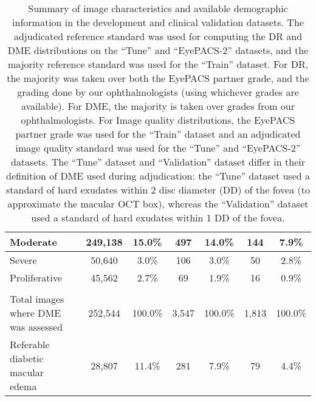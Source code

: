 \documentclass{llncs}
\begin{document}
\begin{table}[h!]
\begin{tabular}{|l|c|c|c|c|c|c|}
    Moderate & 249,138 & 15.0\% & 497 & 14.0\% & 144 & 7.9\% \\ \hline
    Severe & 50,640 & 3.0\% & 106 & 3.0\% & 50 & 2.8\% \\ \hline
    Proliferative & 45,562 & 2.7\% & 69 & 1.9\% & 16 & 0.9\% \\ \hline
    \multicolumn{7}{|c|}{} \\ \hline
    \makecell[l]{Total images where DME \\ was assessed} & 252,544 & 100.0\% & 3,547 & 100.0\% & 1,813 & 100.0\% \\ \hline
    \makecell[l]{Referable diabetic macular \\ edema} & 28,807 & 11.4\% & 281 & 7.9\% & 79 & 4.4\% \\ \hline
  \end{tabular}
  \vspace{4mm}
  \caption{
    Summary of image characteristics and available demographic information in the development and clinical validation datasets. The adjudicated reference standard was used for computing the DR and DME distributions on the ``Tune'' and ``EyePACS-2'' datasets, and the majority reference standard was used for the ``Train'' dataset. For DR, the majority was taken over both the EyePACS partner grade, and the grading done by our ophthalmologists (using whichever grades are available). For DME, the majority is taken over grades from our ophthalmologists. For Image quality distributions, the EyePACS partner grade was used for the ``Train'' dataset and an adjudicated image quality standard was used for the ``Tune'' and ``EyePACS-2'' datasets. The ``Tune'' dataset and ``Validation'' dataset differ in their definition of DME used during adjudication: the ``Tune'' dataset used a standard of hard exudates within 2 disc diameter (DD) of the fovea (to approximate the macular OCT box), whereas the ``Validation'' dataset used a standard of hard exudates within 1 DD of the fovea.
  }
  \label{table:baseline_characteristics}
\end{table}
\newpage
\end{document}
